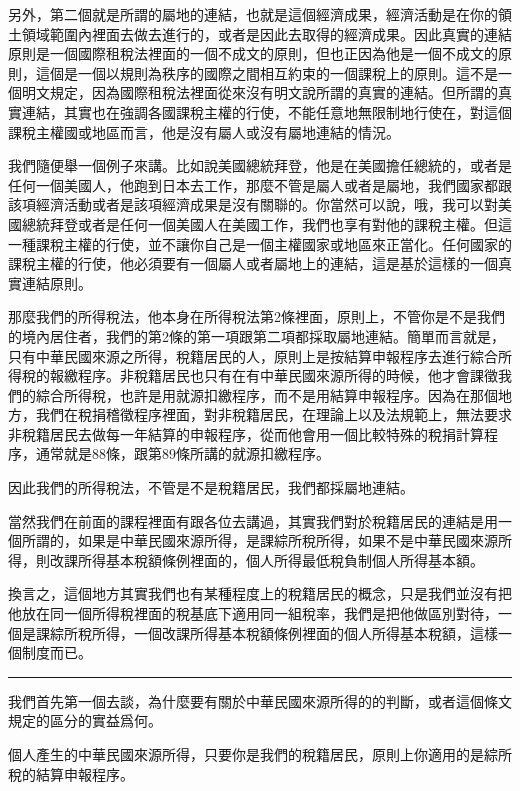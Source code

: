 \documentclass[oneside,sub3section]{ctexbook}
\begin{document}
另外，第二個就是所謂的屬地的連結，也就是這個經濟成果，經濟活動是在你的領土領域範圍內裡面去做去進行的，或者是因此去取得的經濟成果。因此真實的連結原則是一個國際租稅法裡面的一個不成文的原則，但也正因為他是一個不成文的原則，這個是一個以規則為秩序的國際之間相互約束的一個課稅上的原則。這不是一個明文規定，因為國際租稅法裡面從來沒有明文說所謂的真實的連結。但所謂的真實連結，其實也在強調各國課稅主權的行使，不能任意地無限制地行使在，對這個課稅主權國或地區而言，他是沒有屬人或沒有屬地連結的情況。

我們隨便舉一個例子來講。比如說美國總統拜登，他是在美國擔任總統的，或者是任何一個美國人，他跑到日本去工作，那麼不管是屬人或者是屬地，我們國家都跟該項經濟活動或者是該項經濟成果是沒有關聯的。你當然可以說，哦，我可以對美國總統拜登或者是任何一個美國人在美國工作，我們也享有對他的課稅主權。但這一種課稅主權的行使，並不讓你自己是一個主權國家或地區來正當化。任何國家的課稅主權的行使，他必須要有一個屬人或者屬地上的連結，這是基於這樣的一個真實連結原則。

那麼我們的所得稅法，他本身在所得稅法第2條裡面，原則上，不管你是不是我們的境內居住者，我們的第2條的第一項跟第二項都採取屬地連結。簡單而言就是，只有中華民國來源之所得，稅籍居民的人，原則上是按結算申報程序去進行綜合所得稅的報繳程序。非稅籍居民也只有在有中華民國來源所得的時候，他才會課徵我們的綜合所得稅，也許是用就源扣繳程序，而不是用結算申報程序。因為在那個地方，我們在稅捐稽徵程序裡面，對非稅籍居民，在理論上以及法規範上，無法要求非稅籍居民去做每一年結算的申報程序，從而他會用一個比較特殊的稅捐計算程序，通常就是88條，跟第89條所講的就源扣繳程序。

因此我們的所得稅法，不管是不是稅籍居民，我們都採屬地連結。

當然我們在前面的課程裡面有跟各位去講過，其實我們對於稅籍居民的連結是用一個所謂的，如果是中華民國來源所得，是課綜所稅所得，如果不是中華民國來源所得，則改課所得基本稅額條例裡面的，個人所得最低稅負制個人所得基本額。

換言之，這個地方其實我們也有某種程度上的稅籍居民的概念，只是我們並沒有把他放在同一個所得稅裡面的稅基底下適用同一組稅率，我們是把他做區別對待，一個是課綜所稅所得，一個改課所得基本稅額條例裡面的個人所得基本稅額，這樣一個制度而已。

\begin{center}\rule{0.5\linewidth}{0.5pt}\end{center}

我們首先第一個去談，為什麼要有關於中華民國來源所得的的判斷，或者這個條文規定的區分的實益爲何。

個人產生的中華民國來源所得，只要你是我們的稅籍居民，原則上你適用的是綜所稅的結算申報程序。
\end{document}
